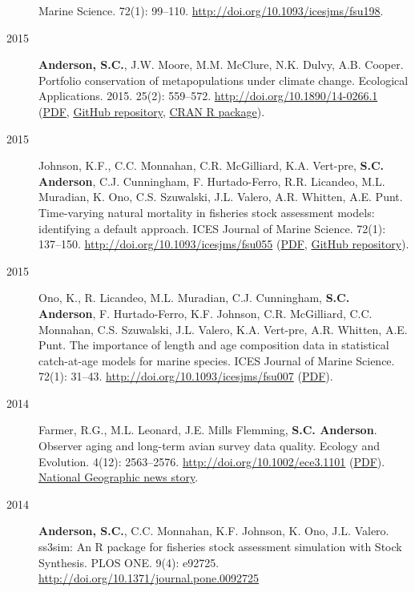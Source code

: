 \begin{description}
Marine Science. 72(1): 99--110.
\url{http://doi.org/10.1093/icesjms/fsu198}.
\item[2015]
\textbf{Anderson, S.C.}, J.W. Moore, M.M. McClure, N.K. Dulvy, A.B.
Cooper. Portfolio conservation of metapopulations under climate change.
Ecological Applications. 2015. 25(2): 559--572.
\url{http://doi.org/10.1890/14-0266.1}
(\href{https://dl.dropboxusercontent.com/u/254940/papers/Anderson_etal_2014_salmon_portfolios.pdf}{PDF},
\href{https://github.com/seananderson/metafolio}{GitHub repository},
\href{http://cran.r-project.org/web/packages/metafolio/index.html}{CRAN
R package}).
\item[2015]
Johnson, K.F., C.C. Monnahan, C.R. McGilliard, K.A. Vert-pre,
\textbf{S.C. Anderson}, C.J. Cunningham, F. Hurtado-Ferro, R.R.
Licandeo, M.L. Muradian, K. Ono, C.S. Szuwalski, J.L. Valero, A.R.
Whitten, A.E. Punt. Time-varying natural mortality in fisheries stock
assessment models: identifying a default approach. ICES Journal of
Marine Science. 72(1): 137--150.
\url{http://doi.org/10.1093/icesjms/fsu055}
(\href{http://icesjms.oxfordjournals.org/content/early/2014/04/09/icesjms.fsu055.full.pdf?keytype=ref\&ijkey=NEXmZIkz3289u3z}{PDF},
\href{https://github.com/ss3sim/natural-mortality}{GitHub repository}).
\item[2015]
Ono, K., R. Licandeo, M.L. Muradian, C.J. Cunningham, \textbf{S.C.
Anderson}, F. Hurtado-Ferro, K.F. Johnson, C.R. McGilliard, C.C.
Monnahan, C.S. Szuwalski, J.L. Valero, K.A. Vert-pre, A.R. Whitten, A.E.
Punt. The importance of length and age composition data in statistical
catch-at-age models for marine species. ICES Journal of Marine Science.
72(1): 31--43. \url{http://doi.org/10.1093/icesjms/fsu007}
(\href{https://dl.dropboxusercontent.com/u/254940/papers/Ono_etal_2014_importance_of_length_and_age_composition_data.pdf}{PDF}).
\item[2014]
Farmer, R.G., M.L. Leonard, J.E. Mills Flemming, \textbf{S.C. Anderson}.
Observer aging and long-term avian survey data quality. Ecology and
Evolution. 4(12): 2563--2576. \url{http://doi.org/10.1002/ece3.1101}
(\href{http://onlinelibrary.wiley.com/doi/10.1002/ece3.1101/pdf}{PDF}).
\href{http://news.nationalgeographic.com/news/2014/08/140805-aging-birders-breeding-bird-survey-volunteers-science/}{National
Geographic news story}.
\item[2014]
\textbf{Anderson, S.C.}, C.C. Monnahan, K.F. Johnson, K. Ono, J.L.
Valero. ss3sim: An R package for fisheries stock assessment simulation
with Stock Synthesis. PLOS ONE. 9(4): e92725.
\url{http://doi.org/10.1371/journal.pone.0092725}

\end{description}
